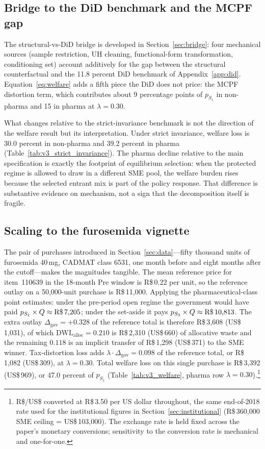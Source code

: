\subsection{Bridge to the DiD benchmark and the MCPF gap}

The structural-vs-DiD bridge is developed in Section~\ref{sec:bridge}: four mechanical sources (sample restriction, UH cleaning, functional-form transformation, conditioning set) account additively for the gap between the structural counterfactual and the 11.8 percent DiD benchmark of Appendix~\ref{app:did}. Equation~\eqref{eq:welfare} adds a fifth piece the DiD does not price: the MCPF distortion term, which contributes about 9 percentage points of $p_{S_1}$ in non-pharma and 15 in pharma at $\lambda = 0.30$.

What changes relative to the strict-invariance benchmark is not the direction of the welfare result but its interpretation. Under strict invariance, welfare loss is 30.0 percent in non-pharma and 39.2 percent in pharma (Table~\ref{tab:v3_strict_invariance}). The pharma decline relative to the main specification is exactly the footprint of equilibrium selection: when the protected regime is allowed to draw in a different SME pool, the welfare burden rises because the selected entrant mix is part of the policy response. That difference is substantive evidence on mechanism, not a sign that the decomposition itself is fragile.

\subsection{Scaling to the furosemida vignette}

The pair of purchases introduced in Section~\ref{sec:data}---fifty thousand units of furosemida 40\,mg, CADMAT class 6531, one month before and eight months after the cutoff---makes the magnitudes tangible. The mean reference price for item~110639 in the 18-month Pre window is R\$\,0.22 per unit, so the reference outlay on a 50{,}000-unit purchase is R\$\,11{,}000. Applying the pharmaceutical-class point estimates: under the pre-period open regime the government would have paid $p_{S_1} \times Q \approx \text{R\$\,7{,}205}$; under the set-aside it pays $p_{S_3} \times Q \approx \text{R\$\,10{,}813}$. The extra outlay $\Delta_{\text{gov}} = +0.328$ of the reference total is therefore R\$\,3{,}608 (US\$\,1{,}031), of which $\mathrm{DWL}_{\text{alloc}} = 0.210$ is R\$\,2{,}310 (US\$\,660) of allocative waste and the remaining $0.118$ is an implicit transfer of R\$\,1{,}298 (US\$\,371) to the SME winner. Tax-distortion loss adds $\lambda \cdot \Delta_{\text{gov}} = 0.098$ of the reference total, or R\$\,1{,}082 (US\$\,309), at $\lambda = 0.30$. Total welfare loss on this single purchase is R\$\,3{,}392 (US\$\,969), or 47.0 percent of $p_{S_1}$ (Table~\ref{tab:v3_welfare}, pharma row $\lambda = 0.30$).\footnote{R\$/US\$ converted at R\$\,3.50 per US dollar throughout, the same end-of-2018 rate used for the institutional figures in Section~\ref{sec:institutional} (R\$\,360{,}000 SME ceiling = US\$\,103{,}000). The exchange rate is held fixed across the paper's monetary conversions; sensitivity to the conversion rate is mechanical and one-for-one.}

